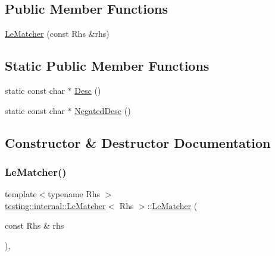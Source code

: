 \subsection*{Public Member Functions}
\begin{DoxyCompactItemize}
\item 
\hyperlink{classtesting_1_1internal_1_1_le_matcher_ae3dce3765263397fa5de202d45d0bdb5}{Le\+Matcher} (const Rhs \&rhs)
\end{DoxyCompactItemize}
\subsection*{Static Public Member Functions}
\begin{DoxyCompactItemize}
\item 
static const char $\ast$ \hyperlink{classtesting_1_1internal_1_1_le_matcher_adfef0084cb0f28503a40d7157699519b}{Desc} ()
\item 
static const char $\ast$ \hyperlink{classtesting_1_1internal_1_1_le_matcher_a01dada192b6f7139b66bbc198b3cb03b}{Negated\+Desc} ()
\end{DoxyCompactItemize}


\subsection{Constructor \& Destructor Documentation}
\mbox{\label{classtesting_1_1internal_1_1_le_matcher_ae3dce3765263397fa5de202d45d0bdb5}} 
\subsubsection{\texorpdfstring{Le\+Matcher()}{LeMatcher()}}
{\footnotesize\ttfamily template$<$typename Rhs $>$ \\
\hyperlink{classtesting_1_1internal_1_1_le_matcher}{testing\+::internal\+::\+Le\+Matcher}$<$ Rhs $>$\+::\hyperlink{classtesting_1_1internal_1_1_le_matcher}{Le\+Matcher} (\begin{DoxyParamCaption}\item[{const Rhs \&}]{rhs }\end{DoxyParamCaption})\hspace{0.3cm}{\ttfamily [inline]}, {\ttfamily [explicit]}}



